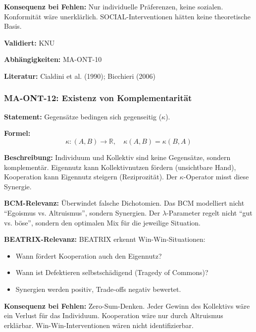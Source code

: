 \textbf{Konsequenz bei Fehlen:}
Nur individuelle Präferenzen, keine sozialen. Konformität wäre unerklärlich. SOCIAL-Interventionen hätten keine theoretische Basis.

\textbf{Validiert:} KNU

\textbf{Abhängigkeiten:} MA-ONT-10

\textbf{Literatur:} Cialdini et al. (1990); Bicchieri (2006)


\subsubsection*{MA-ONT-12: Existenz von Komplementarität}

\textbf{Statement:} Gegensätze bedingen sich gegenseitig ($\kappa$).

\textbf{Formel:}
\begin{equation}
\kappa: (A, B) \rightarrow \mathbb{R}, \quad \kappa(A, B) = \kappa(B, A)
\end{equation}

\textbf{Beschreibung:}
Individuum und Kollektiv sind keine Gegensätze, sondern komplementär. Eigennutz kann Kollektivnutzen fördern (unsichtbare Hand), Kooperation kann Eigennutz steigern (Reziprozität). Der $\kappa$-Operator misst diese Synergie.

\textbf{BCM-Relevanz:}
Überwindet falsche Dichotomien. Das BCM modelliert nicht ``Egoismus vs. Altruismus'', sondern Synergien. Der $\lambda$-Parameter regelt nicht ``gut vs. böse'', sondern den optimalen Mix für die jeweilige Situation.

\textbf{BEATRIX-Relevanz:}
BEATRIX erkennt Win-Win-Situationen:
\begin{itemize}
    \item Wann fördert Kooperation auch den Eigennutz?
    \item Wann ist Defektieren selbstschädigend (Tragedy of Commons)?
    \item Synergien werden positiv, Trade-offs negativ bewertet.
\end{itemize}

\textbf{Konsequenz bei Fehlen:}
Zero-Sum-Denken. Jeder Gewinn des Kollektivs wäre ein Verlust für das Individuum. Kooperation wäre nur durch Altruismus erklärbar. Win-Win-Interventionen wären nicht identifizierbar.

